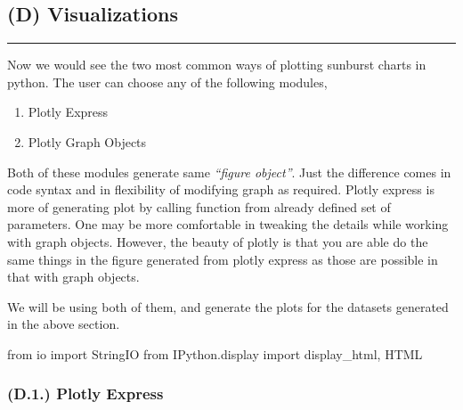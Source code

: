 \documentclass[
  letterpaper,
  DIV=11,
  numbers=noendperiod]{scrartcl}
\newenvironment{Shaded}{\begin{snugshade}}{\end{snugshade}}
\newcommand{\ImportTok}[1]{\textcolor[rgb]{0.00,0.46,0.62}{#1}}
\newcommand{\NormalTok}[1]{\textcolor[rgb]{0.00,0.23,0.31}{#1}}
\providecommand{\tightlist}{%
  \setlength{\itemsep}{0pt}\setlength{\parskip}{0pt}}\usepackage{longtable,booktabs,array}
\begin{document}
\hypertarget{d-visualizations}{%
\subsection{(D) Visualizations}\label{d-visualizations}}

\begin{center}\rule{0.5\linewidth}{0.5pt}\end{center}

Now we would see the two most common ways of plotting sunburst charts in
python. The user can choose any of the following modules,

\begin{enumerate}
\def\labelenumi{\arabic{enumi}.}
\tightlist
\item
  Plotly Express
\item
  Plotly Graph Objects
\end{enumerate}

Both of these modules generate same \emph{``figure object''}. Just the
difference comes in code syntax and in flexibility of modifying graph as
required. Plotly express is more of generating plot by calling function
from already defined set of parameters. One may be more comfortable in
tweaking the details while working with graph objects. However, the
beauty of plotly is that you are able do the same things in the figure
generated from plotly express as those are possible in that with graph
objects.

We will be using both of them, and generate the plots for the datasets
generated in the above section.

\begin{Shaded}
\begin{Highlighting}[]
\ImportTok{from}\NormalTok{ io }\ImportTok{import}\NormalTok{ StringIO}
\ImportTok{from}\NormalTok{ IPython.display }\ImportTok{import}\NormalTok{ display\_html, HTML}
\end{Highlighting}
\end{Shaded}

\hypertarget{d.1.-plotly-express}{%
\subsubsection{(D.1.) Plotly Express}\label{d.1.-plotly-express}}
\end{document}
